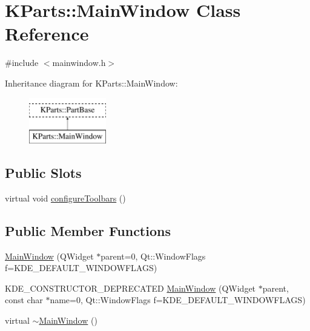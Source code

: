 \hypertarget{classKParts_1_1MainWindow}{\section{\-K\-Parts\-:\-:\-Main\-Window \-Class \-Reference}
\label{classKParts_1_1MainWindow}
}


{\ttfamily \#include $<$mainwindow.\-h$>$}

\-Inheritance diagram for \-K\-Parts\-:\-:\-Main\-Window\-:\begin{figure}[H]
\begin{center}
\leavevmode
\includegraphics[height=2.000000cm]{classKParts_1_1MainWindow}
\end{center}
\end{figure}
\subsection*{\-Public \-Slots}
\begin{DoxyCompactItemize}
\item 
virtual void \hyperlink{classKParts_1_1MainWindow_a06a7c6c817f9b280804b0cabd28b3696}{configure\-Toolbars} ()
\end{DoxyCompactItemize}
\subsection*{\-Public \-Member \-Functions}
\begin{DoxyCompactItemize}
\item 
\hyperlink{classKParts_1_1MainWindow_a0691c70bec34e706409f019b91ca3173}{\-Main\-Window} (\-Q\-Widget $\ast$parent=0, \-Qt\-::\-Window\-Flags f=\-K\-D\-E\-\_\-\-D\-E\-F\-A\-U\-L\-T\-\_\-\-W\-I\-N\-D\-O\-W\-F\-L\-A\-G\-S)
\item 
\-K\-D\-E\-\_\-\-C\-O\-N\-S\-T\-R\-U\-C\-T\-O\-R\-\_\-\-D\-E\-P\-R\-E\-C\-A\-T\-E\-D \hyperlink{classKParts_1_1MainWindow_ad157c37ff711ecd0784569acb2582e07}{\-Main\-Window} (\-Q\-Widget $\ast$parent, const char $\ast$name=0, \-Qt\-::\-Window\-Flags f=\-K\-D\-E\-\_\-\-D\-E\-F\-A\-U\-L\-T\-\_\-\-W\-I\-N\-D\-O\-W\-F\-L\-A\-G\-S)
\item 
virtual \hyperlink{classKParts_1_1MainWindow_a475129f2af4142fbe3612ec61ee411ef}{$\sim$\-Main\-Window} ()
\end{DoxyCompactItemize}
